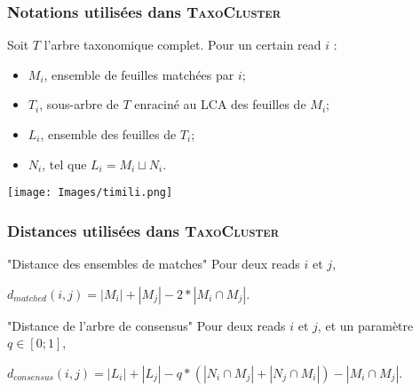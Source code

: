 \documentclass{beamer}
\begin{document}
\begin{frame}
\frametitle{Notations utilisées dans \textsc{\bf TaxoCluster}}

Soit $T$ l'arbre taxonomique complet. Pour un certain read $i$ :
\begin{itemize}
\item $M_{i}$, ensemble de feuilles matchées par $i$;
\pause
\item $T_{i}$, sous-arbre de $T$ enraciné au LCA des feuilles de $M_{i}$;
\pause
\item $L_{i}$, ensemble des feuilles de $T_{i}$;
\pause
\item $N_{i}$, tel que $L_{i} = M_{i} \sqcup N_{i}$.
\pause
\end{itemize}

\begin{center}
\texttt{[image: Images/timili.png]}
\end{center}

\end{frame}

\begin{frame}
\frametitle{Distances utilisées dans \textsc{\bf TaxoCluster}}

\begin{block}{"Distance des ensembles de matches"}
Pour deux reads $i$ et $j$,\\
\begin{center} $d_{matched}(i,j) = |M_{i}| + |M_{j}| - 2*|M_{i} \cap M_{j}|$. \end{center}
\end{block}

\pause

\begin{block}{"Distance de l'arbre de consensus"}
Pour deux reads $i$ et $j$, et un paramètre $q \in [0;1]$,
\begin{center}$d_{consensus}(i,j) = |L_{i}| + |L_{j}| - q*(|N_{i}\cap M_{j}| + |N_{j} \cap M_{i}|) - |M_{i} \cap M_{j}|$.\end{center}
\end{block}


\end{frame}
\end{document}
